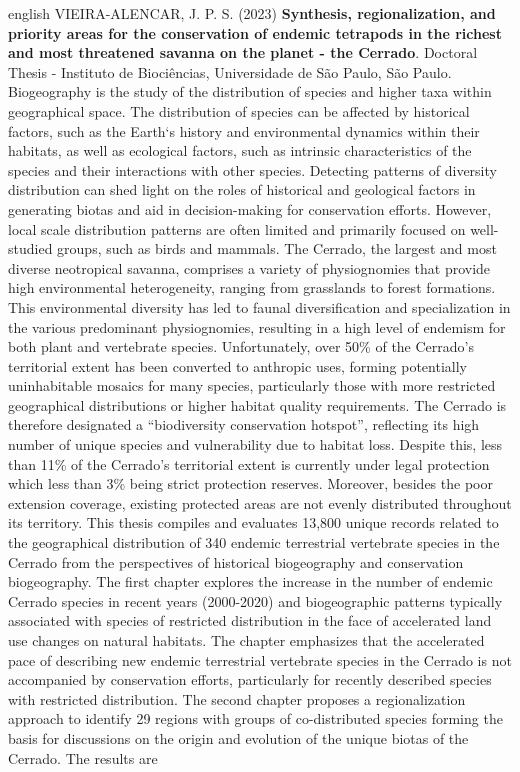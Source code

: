 \documentclass[12pt,openright,oneside,a4paper,english]{abntex2}
\begin{document}
\begin{resumo}[Abstract]
	\begin{otherlanguage*}{english}
		VIEIRA-ALENCAR, J. P. S. (2023) \textbf{Synthesis, regionalization, and priority areas for the conservation of endemic tetrapods in the richest and most threatened savanna on the planet - the Cerrado}. Doctoral Thesis - Instituto de Biociências, Universidade de São Paulo, São Paulo.\\
		
		Biogeography is the study of the distribution of species and higher taxa within geographical space. The distribution of species can be affected by historical factors, such as the Earth‘s history and environmental dynamics within their habitats, as well as ecological factors, such as intrinsic characteristics of the species and their interactions with other species. Detecting patterns of diversity distribution can shed light on the roles of historical and geological factors in generating biotas and aid in decision-making for conservation efforts. However, local scale distribution patterns are often limited and primarily focused on well-studied groups, such as birds and mammals. The Cerrado, the largest and most diverse neotropical savanna, comprises a variety of physiognomies that provide high environmental heterogeneity, ranging from grasslands to forest formations. This environmental diversity has led to faunal diversification and specialization in the various predominant physiognomies, resulting in a high level of endemism for both plant and vertebrate species. Unfortunately, over 50\% of the Cerrado’s territorial extent has been converted to anthropic uses, forming potentially uninhabitable mosaics for many species, particularly those with more restricted geographical distributions or higher habitat quality requirements. The Cerrado is therefore designated a “biodiversity conservation hotspot”, reflecting its high number of unique species and vulnerability due to habitat loss. Despite this, less than 11\% of the Cerrado’s territorial extent is currently under legal protection which less than 3\% being strict protection reserves. Moreover, besides the poor extension coverage, existing protected areas are not evenly distributed throughout its territory. This thesis compiles and evaluates 13,800 unique records related to the geographical distribution of 340 endemic terrestrial vertebrate species in the Cerrado from the perspectives of historical biogeography and conservation biogeography. The first chapter explores the increase in the number of endemic Cerrado species in recent years (2000-2020) and biogeographic patterns typically associated with species of restricted distribution in the face of accelerated land use changes on natural habitats. The chapter emphasizes that the accelerated pace of describing new endemic terrestrial vertebrate species in the Cerrado is not accompanied by conservation efforts, particularly for recently described species with restricted distribution. The second chapter proposes a regionalization approach to identify 29 regions with groups of co-distributed species forming the basis for discussions on the origin and evolution of the unique biotas of the Cerrado. The results are 
\end{otherlanguage*}
\end{resumo}
\end{document}
